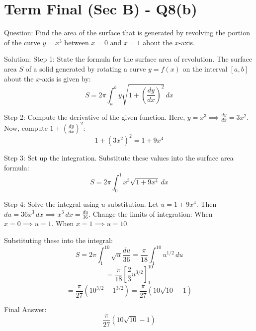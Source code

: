 \documentclass{article}
\begin{document}
\section*{Term Final (Sec B) - Q8(b)}
Question:
Find the area of the surface that is generated by revolving the portion of the curve \(y = x^3\) between \(x = 0\) and \(x = 1\) about the \(x\)-axis.

Solution:
Step 1: State the formula for the surface area of revolution.
The surface area \(S\) of a solid generated by rotating a curve \(y = f(x)\) on the interval \([a, b]\) about the \(x\)-axis is given by:
\[
S = 2\pi \int_a^b y \sqrt{1 + \left(\frac{dy}{dx}\right)^2} \, dx
\]

Step 2: Compute the derivative of the given function.
Here, \(y = x^3 \implies \frac{dy}{dx} = 3x^2\).
Now, compute \(1 + \left(\frac{dy}{dx}\right)^2\):
\[
1 + (3x^2)^2 = 1 + 9x^4
\]

Step 3: Set up the integration.
Substitute these values into the surface area formula:
\[
S = 2\pi \int_0^1 x^3 \sqrt{1 + 9x^4} \, dx
\]

Step 4: Solve the integral using \(u\)-substitution.
Let \(u = 1 + 9x^4\).
Then \(du = 36x^3 \, dx \implies x^3 \, dx = \frac{du}{36}\).
Change the limits of integration:
When \(x = 0 \implies u = 1\).
When \(x = 1 \implies u = 10\).

Substituting these into the integral:
\[
S = 2\pi \int_1^{10} \sqrt{u} \frac{du}{36} = \frac{\pi}{18} \int_1^{10} u^{1/2} \, du
\]
\[
= \frac{\pi}{18} \left[ \frac{2}{3} u^{3/2} \right]_1^{10}
\]
\[
= \frac{\pi}{27} (10^{3/2} - 1^{3/2}) = \frac{\pi}{27} (10\sqrt{10} - 1)
\]

Final Answer:
\[
\boxed{\frac{\pi}{27} (10\sqrt{10} - 1)}
\]
\end{document}
